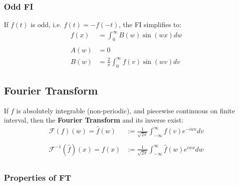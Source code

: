 \subsubsection{Odd FI}
If $f(t)$ is odd, i.e. $f(t)=-f(-t)$, the FI simplifies to:
\begin{align*}
    f(x) & =\int_0^\infty B(w)\sin(wx)dw          \\\\
    A(w) & =0                                     \\
    B(w) & =\frac2\pi\int_0^\infty f(v)\sin(wv)dv
\end{align*}

\subsection{Fourier Transform}
If $f$ is absolutely integrable (non-periodic), and piecewise continuous on finite interval,
then the \textbf{Fourier Transform} and its inverse exist:
\begin{align*}
    \mathcal{F}(f)(w)=\widehat{f}(w)      & :=\frac1{\sqrt{2\pi}}\int_{-\infty}^{\infty}f(v)e^{-iwv}dv          \\\\
    \mathcal{F}^{-1}(\widehat{f})(x)=f(x) & :=\frac1{\sqrt{2\pi}}\int_{-\infty}^{\infty}\widehat{f}(w)e^{iwx}dw \\
\end{align*}
\subsubsection{Properties of FT}

